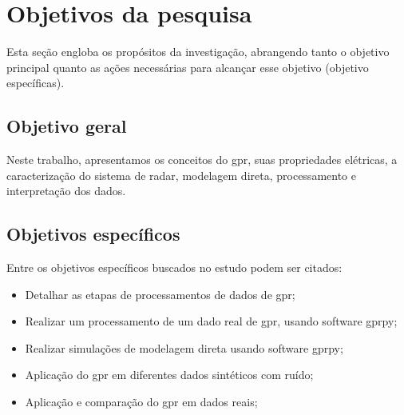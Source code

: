 

\section{Objetivos da pesquisa}
\label{sec:objetivos-da-pesquisa}

Esta seção engloba os propósitos da investigação, abrangendo tanto o objetivo principal quanto as ações necessárias para alcançar esse objetivo (objetivo específicas).

\subsection{Objetivo geral}
\label{subsec:objetivo-geral}
Neste trabalho, apresentamos os conceitos do \ac*{gpr}, suas propriedades elétricas, a caracterização do sistema de radar, modelagem direta, processamento e  interpretação dos dados.

\subsection{Objetivos específicos}
\label{subsec:objetivos-especificos}
Entre os objetivos específicos buscados no estudo podem ser citados:
\begin{itemize}
    \item Detalhar as etapas de processamentos de dados de \ac*{gpr};
    \item Realizar um processamento de um dado real de \ac*{gpr}, usando software \ac{gprpy};
    \item Realizar simulações de modelagem direta usando software \ac{gprpy};
    \item Aplicação do \ac{gpr} em diferentes dados sintéticos com ruído;
    \item Aplicação e comparação do \ac*{gpr} em dados reais;
\end{itemize}